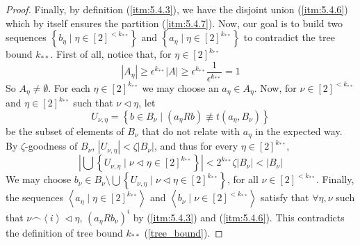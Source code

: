 \begin{proof}
            Finally, by definition (\ref{itm:5.4.3}), we have the disjoint union (\ref{itm:5.4.6}) which by itself ensures
            the partition (\ref{itm:5.4.7}).
            Now, our goal is to build two sequences $\left\{ b_\eta \mid \eta \in [2]^{<k_{**}} \right\}$ and
            $\left\{ a_\eta \mid \eta \in [2]^{k_{**}} \right\}$ to contradict the tree bound $k_{**}$.
            First of all, notice that, for $\eta \in [2]^{k_{**}}$
            \[
                |A_\eta| \geq \epsilon^{k_{**}} |A| \geq
                \epsilon^{k_{**}} \frac{1}{\epsilon^{k_{**}}} = 1
            \]
            So $A_\eta \neq \emptyset$.
            For each $\eta \in [2]^{k_{**}}$ we may choose an $a_\eta \in A_\eta$.
            Now, for $\nu \in [2]^{<k_{**}}$ and $\eta \in [2]^{k_{**}}$ such that $\nu \triangleleft \eta$, let
            \[
                U_{\nu,\eta} = \left\{ b \in B_\nu \mid (a_\eta R b) \not\equiv t(a_\eta, B_\nu) \right\}
            \]
            be the subset of elements of $B_\nu$ that do not relate with $a_\eta$ in the expected way.
            By $\zeta$-goodness of $B_\nu$, $|U_{\nu, \eta}| < \zeta |B_\nu|$, and thus for every $\eta \in [2]^{k_{**}}$,
            \[
                \left|\bigcup\left\{ U_{\nu,\eta} \mid \nu \triangleleft \eta \in [2]^{k_{**}} \right\}\right| <
                2^{k_{**}} \zeta |B_\nu| < |B_\nu|
            \]
            We may choose $b_\nu \in B_\nu \setminus \bigcup\left\{ U_{\nu,\eta} \mid \nu \triangleleft \eta \in [2]^{k_{**}} \right\}$,
            for all $\nu \in [2]^{<k_{**}}$.
            Finally, the sequences $\left< a_\eta \mid \eta \in [2]^{k_{**}} \right>$ and $\left< b_\nu \mid \nu \in [2]^{<k_{**}} \right>$
            satisfy that $\forall \eta, \nu$ such that $\nu \frown \left< i \right> \triangleleft \eta$, $\left( a_\eta R b_\nu \right)^i$
            by (\ref{itm:5.4.3}) and (\ref{itm:5.4.6}).
            This contradicts the definition of tree bound $k_{**}$ (\ref{tree_bound}).
        \end{proof}

